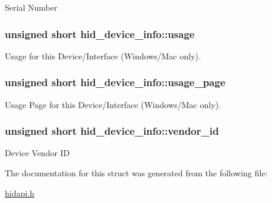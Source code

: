 \-Serial \-Number \hypertarget{structhid__device__info_a47f8011d58bcddd67f1403d6d3b4cab6}{
\subsubsection[{usage}]{\setlength{\rightskip}{0pt plus 5cm}unsigned short {\bf hid\-\_\-device\-\_\-info\-::usage}}}\label{structhid__device__info_a47f8011d58bcddd67f1403d6d3b4cab6}
\-Usage for this \-Device/\-Interface (\-Windows/\-Mac only). \hypertarget{structhid__device__info_ab811117f8084ce2036815bdd33b16b3b}{
\subsubsection[{usage\-\_\-page}]{\setlength{\rightskip}{0pt plus 5cm}unsigned short {\bf hid\-\_\-device\-\_\-info\-::usage\-\_\-page}}}\label{structhid__device__info_ab811117f8084ce2036815bdd33b16b3b}
\-Usage \-Page for this \-Device/\-Interface (\-Windows/\-Mac only). \hypertarget{structhid__device__info_a5037a3914e0bd8a3f821d1be9376c709}{
\subsubsection[{vendor\-\_\-id}]{\setlength{\rightskip}{0pt plus 5cm}unsigned short {\bf hid\-\_\-device\-\_\-info\-::vendor\-\_\-id}}}\label{structhid__device__info_a5037a3914e0bd8a3f821d1be9376c709}
\-Device \-Vendor \-I\-D 

\-The documentation for this struct was generated from the following file\-:\begin{DoxyCompactItemize}
\item 
\hyperlink{hidapi_8h}{hidapi.\-h}\end{DoxyCompactItemize}
